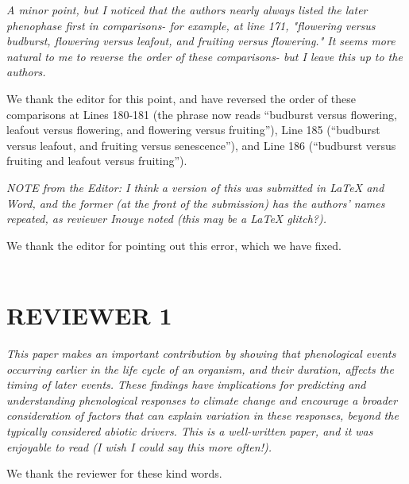 \documentclass[10.95pt,a4paper]{letter}
\begin{document}
\emph{A minor point, but I noticed that the authors nearly always listed the later phenophase first in comparisons- for example, at line 171, "flowering versus budburst, flowering versus leafout, and fruiting versus flowering."  It seems more natural to me to reverse the order of these comparisons- but I leave this up to the authors.}  
\par We thank the editor for this point, and have reversed the order of these comparisons at Lines 180-181 (the phrase now reads ``budburst versus flowering, leafout versus flowering, and flowering versus fruiting''), Line 185 (``budburst versus leafout, and fruiting versus senescence''), and Line 186 (``budburst versus fruiting and leafout versus fruiting''). 
\par \emph{NOTE from the Editor: I think a version of this was submitted in LaTeX and Word, and the former (at the front of the submission) has the authors' names repeated, as reviewer Inouye noted (this may be a LaTeX glitch?).}
\par We thank the editor for pointing out this error, which we have fixed. 
\\
\\
\section {REVIEWER 1}
\par \emph{This paper makes an important contribution by showing that phenological events occurring earlier in the life cycle of an organism, and their duration, affects the timing of later events.  These findings have implications for predicting and understanding phenological responses to climate change and encourage a broader consideration of factors that can explain variation in these responses, beyond the typically considered abiotic drivers. This is a well-written paper, and it was enjoyable to read (I wish I could say this more often!).}
\par We thank the reviewer for these kind words.
\end{document}
